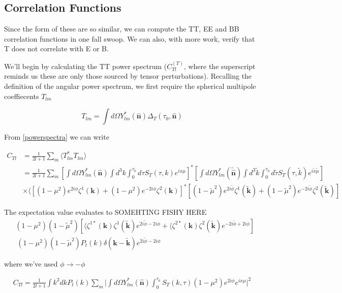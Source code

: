 \documentclass[a4paper,11pt]{article}
\renewcommand{\v}[1]{\mathbf{#1}}
\newcommand{\unit}[1]{\hat{\v{#1}}}
\begin{document}
\subsection{Correlation Functions}

Since the form of these are so similar, we can compute the TT, EE and BB correlation functions in one fall swoop. We can also, with more work, verify that T does not correlate with E or B.

We'll begin by calculating the TT power spectrum ($C_{Tl}^{(T)}$, where the superscript reminds us these are only those sourced by tensor perturbations). Recalling the definition of the angular power spectrum, we first require the spherical multipole coeffiecents $T_{lm}$  

\begin{equation}
T_{lm} = \int d\Omega Y_{lm}^*(\unit{n})\Delta_T(\tau_0,\unit{n})
\end{equation}

From \ref{powerspectra} we can write 

\begin{align}
C_{Tl} &= \frac{1}{2l+1}\sum_m \langle T_{lm}^*T_{lm} \rangle \\
&= \frac{1}{2l+1} \sum_m [\int d\Omega Y_{lm}^*(\unit{n})\int d^3k\int_0^{\tau_0}d\tau S_T(\tau,k)e^{ix\mu}]^*
[\int d\Omega Y_{lm}^*(\tilde{\unit{n}})\int d^3\tilde{k}\int_0^{\tau_0}d\tilde{\tau}S_T(\tau,\tilde{k})e^{i\tilde{x}\tilde{\mu}}]\\
&\times
\langle [(1-\mu^2) e^{2i\phi} \zeta^1(\v{k})+(1-\mu^2) e^{-2i\phi} \zeta^2(\v{k})]^*[(1-\tilde{\mu}^2) e^{2i\tilde{\phi}} \zeta^1(\v{\tilde{k}})+(1-\tilde{\mu}^2) e^{-2i\tilde{\phi}} \zeta^2(\v{\tilde{k}})]
\end{align}

The expectation value evaluates to
SOMEHTING FISHY HERE
\begin{align}
&(1-\mu^2)(1-\tilde{\mu}^2)[\langle\zeta^{1*}(\v{k})\zeta^1(\v{\tilde{k}})e^{2i\tilde{\phi}-2i\phi}+\langle\zeta^{2*}(\v{k})\zeta^2(\v{\tilde{k}})e^{-2i\tilde{\phi}+2i\phi}]\\
&~ (1-\mu^2)(1-\tilde{\mu}^2)P_t(k)\delta(\v{k}-\v{\tilde{k}})e^{2i\tilde{\phi}-2i\phi}
\end{align}

where we've used $\phi\rightarrow -\phi$ 

\begin{align}
C_{Tl} = \frac{1}{2l+1} \int k^2 dk P_t(k) \sum_m \bigg| \int d\Omega Y^*_{lm}(\unit{n}) \int_0^{\tau_0} S_T(k,\tau)(1-\mu^2)e^{2i\phi}e^{ix\mu} \bigg|^2
\end{align}
\end{document}
